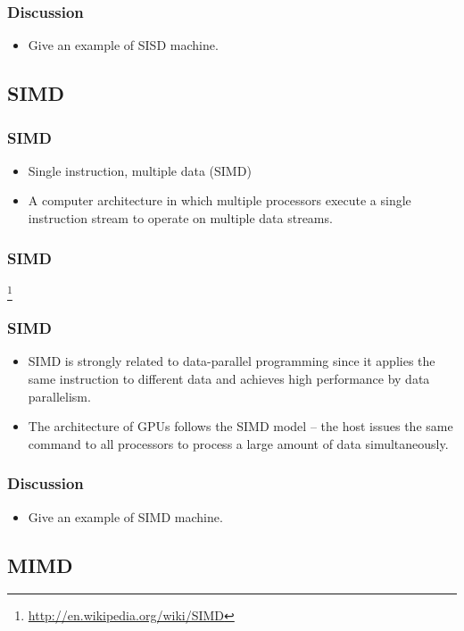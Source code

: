 \documentclass{beamer}
\begin{document}
\begin{CJK}{UTF8}{bsmi}
\begin{frame}
\frametitle{Discussion}
\begin{itemize}
\item Give an example of SISD machine.
\end{itemize}
\end{frame}

\subsection{SIMD}

\begin{frame}
\frametitle{SIMD}
\begin{itemize}
\item Single instruction, multiple data (SIMD) 
\item A computer architecture in which multiple processors execute a
  single instruction stream to operate on multiple data streams.
\end{itemize}
\end{frame}

\begin{frame}
\frametitle{SIMD}
\centerline{}
\footnote{\url{http://en.wikipedia.org/wiki/SIMD}}
\end{frame}

\begin{frame}
\frametitle{SIMD}
\begin{itemize}
\item SIMD is strongly related to data-parallel programming since it applies the same instruction to different data and achieves high performance by data parallelism.
\item The architecture of GPUs follows the SIMD model -- the host issues the same command to all processors to process a large amount of data simultaneously.
\end{itemize}
\end{frame}

\begin{frame}
\frametitle{Discussion}
\begin{itemize}
\item Give an example of SIMD machine.
\end{itemize}
\end{frame}


\subsection{MIMD}


\end{CJK}
\end{document}
